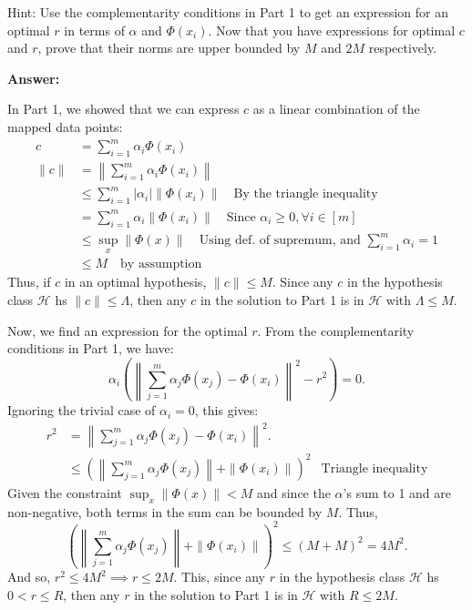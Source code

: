 \documentclass{article}
\begin{document}
Hint: Use the complementarity conditions in Part 1 to get an expression for an optimal $r$ in terms of $\alpha$ and $\Phi(x_i)$.
Now that you have expressions for optimal $c$ and $r$, prove that their norms are upper bounded by $M$ and $2M$ respectively.

\textbf{Answer:}

In Part 1, we showed that we can express $c$ as a linear combination of the mapped data points:
\begin{align*}
    c &= \sum_{i=1}^{m} \alpha_i \Phi(x_i) \\
    \|c\| &= \left\| \sum_{i=1}^{m} \alpha_i \Phi(x_i) \right\| \\
    &\leq \sum_{i=1}^{m} |\alpha_i| \left\| \Phi(x_i) \right\| \quad \text{By the triangle inequality} \\
    &= \sum_{i=1}^{m} \alpha_i \left\| \Phi(x_i) \right\| \quad \text{Since $\alpha_i \geq 0, \forall i \in [m]$} \\
    &\leq \sup_x{\|\Phi(x)\|} \quad \text{Using def. of supremum, and $\sum_{i=1}^{m} \alpha_i = 1$} \\
    &\leq M\quad \text{by assumption}
\end{align*}
Thus, if $c$ in an optimal hypothesis, $\|c\| \leq M$.
Since any $c$ in the hypothesis class $\mathcal{H}$ hs $\|c\| \leq \Lambda$, then any $c$ in the solution to Part 1 is in $\mathcal{H}$ with $\Lambda \leq M$.

Now, we find an expression for the optimal $r$.
From the complementarity conditions in Part 1, we have:
$$\alpha_i \left( \left\| \sum_{j=1}^{m} \alpha_j \Phi(x_j) - \Phi(x_i) \right\|^2 - r^2 \right) = 0.$$
Ignoring the trivial case of \( \alpha_i = 0 \), this gives:
\begin{align*}
    r^2 &= \left\| \sum_{j=1}^{m} \alpha_j \Phi(x_j) - \Phi(x_i) \right\|^2. \\
    &\leq \left( \left\| \sum_{j=1}^{m} \alpha_j \Phi(x_j) \right\| + \|\Phi(x_{i})\| \right)^2 &\text{Triangle inequality}
\end{align*}
Given the constraint \( \sup_x{\|\Phi(x)\| < M} \) and since the \( \alpha \)'s sum to 1 and are non-negative, both terms in the sum can be bounded by \( M \).
Thus,
$$\left( \left\| \sum_{j=1}^{m} \alpha_j \Phi(x_j) \right\| + \|\Phi(x_{i})\| \right)^2 \leq (M + M)^2 = 4M^2.$$
And so, $r^2 \leq 4M^2 \implies r \leq 2M.$
This, since any $r$ in the hypothesis class $\mathcal{H}$ hs $0 < r \leq R$, then any $r$ in the solution to Part 1 is in $\mathcal{H}$ with $R \leq 2M$.
\end{document}
